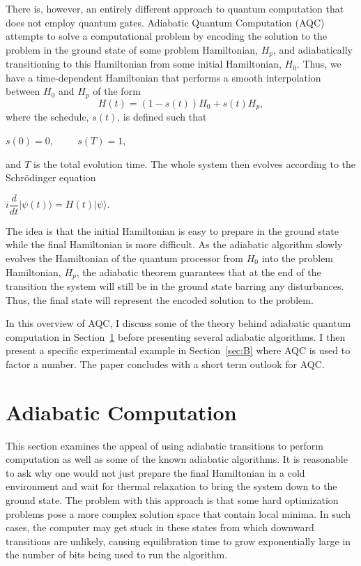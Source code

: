 \documentclass[%
 reprint,
 amsmath,amssymb,
 aps,
]{revtex4-1}
\begin{document}
   There is, however, an entirely different approach to quantum computation that does not employ quantum gates. Adiabatic Quantum Computation (AQC) attempts to solve a computational problem by encoding the solution to the problem in the ground state of some problem Hamiltonian, $H_p$, and adiabatically transitioning to this Hamiltonian from some initial Hamiltonian, $H_0$\cite{RevModPhys.90.015002}. Thus, we have a time-dependent Hamiltonian that performs a smooth interpolation between $H_0$ and $H_p$ of the form 
	\begin{equation}
		H(t) = (1-s(t))H_0 + s(t)H_p, 
		\label{eq:Ht}
	\end{equation}
where the schedule, $s(t)$, is defined such that
	\begin{center}
		$s(0) = 0, \hspace{1cm} s(T) = 1,$
	\end{center}
and $T$ is the total evolution time. The whole system then evolves according to the Schr{\"o}dinger equation
 	\begin{center}
		$i\dfrac{d}{dt}\vert\psi(t)\rangle = H(t)\vert\psi\rangle$.
	\end{center}
	
   The idea is that the initial Hamiltonian is easy to prepare in the ground state while the final Hamiltonian is more difficult. As the adiabatic algorithm slowly evolves the Hamiltonian of the quantum processor from $H_0$ into the problem Hamiltonian, $H_p$, the adiabatic theorem guarantees that at the end of the transition the system will still be in the ground state barring any disturbances. Thus, the final state will represent the encoded solution to the problem. 

   In this overview of AQC, I discuss some of the theory behind adiabatic quantum computation in Section~\ref{sec:A} before presenting several adiabatic algorithms. I then present a specific experimental example in Section~\ref{sec:B} where AQC is used to factor a number. The paper concludes with a short term outlook for AQC.
   
   \section{Adiabatic Computation}\label{sec:A}
   
   This section examines the appeal of using adiabatic transitions to perform computation as well as some of the known adiabatic algorithms. It is reasonable to ask why one would not just prepare the final Hamiltonian in a cold environment and wait for thermal relaxation to bring the system down to the ground state. The problem with this approach is that some hard optimization problems pose a more complex solution space that contain local minima. In such cases, the computer may get stuck in these states from which downward transitions are unlikely, causing equilibration time to grow exponentially large in the number of bits being used to run the algorithm.
   
\end{document}
